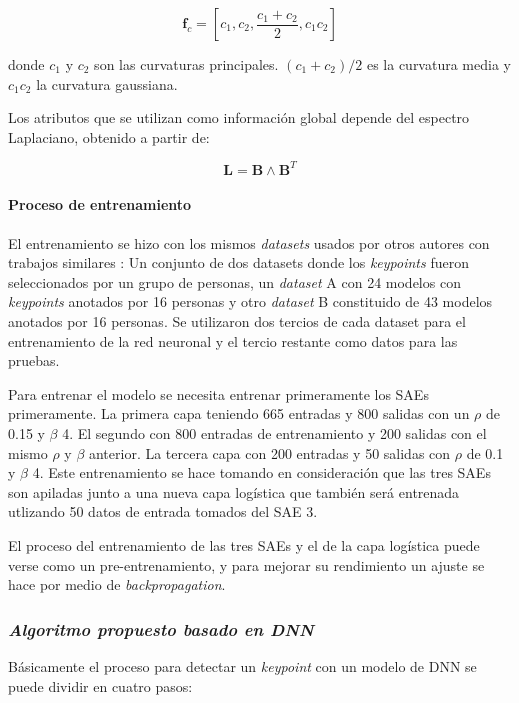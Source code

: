 \documentclass[conference]{IEEEtran}
\begin{document}
\begin{equation}
\bm{f}_{c} = [c_{1}, c_{2}, \frac{c_{1} + c_{2}}{2}, c_{1}c_{2}]
\end{equation}

donde $c_{1}$ y $c_{2}$ son las curvaturas principales. $(c_{1} + c_{2})/2$ es la curvatura media y $c_{1}c_{2}$ la curvatura gaussiana.

Los atributos que se utilizan como información global depende del espectro Laplaciano, obtenido a partir de:

\begin{equation}
\bm{L} = \bm{B} \wedge \bm{B}^{T}
\end{equation}

\paragraph{Proceso de entrenamiento}
El entrenamiento se hizo con los mismos \textit{datasets} usados por otros autores con trabajos similares \cite{forest}: Un conjunto de dos datasets donde los \textit{keypoints} fueron seleccionados por un grupo de personas, un \textit{dataset} A con 24 modelos con \textit{keypoints} anotados por 16 personas y otro \textit{dataset} B constituido de 43 modelos anotados por 16 personas. Se utilizaron dos tercios de cada dataset para el entrenamiento de la red neuronal y el tercio restante como datos para las pruebas. 

Para entrenar el modelo se necesita entrenar primeramente los SAEs primeramente. La primera capa teniendo 665 entradas y 800 salidas con un $\rho$ de 0.15 y $\beta$ 4. El segundo con 800 entradas de entrenamiento y 200 salidas con el mismo $\rho$ y $\beta$ anterior. La tercera capa con 200 entradas y 50 salidas con $\rho$ de 0.1 y $\beta$ 4. Este entrenamiento se hace tomando en consideración que las tres SAEs son apiladas junto a una nueva capa logística que también será entrenada utlizando 50 datos de entrada tomados del SAE 3.

El proceso del entrenamiento de las tres SAEs y el de la capa logística puede verse como un pre-entrenamiento, y para mejorar su rendimiento un ajuste se hace por medio de \textit{backpropagation}.

\subsubsection{\textit{Algoritmo propuesto basado en \textit{DNN}}}
Básicamente el proceso para detectar un \textit{keypoint} con un modelo de DNN se puede dividir en cuatro pasos:
\end{document}

